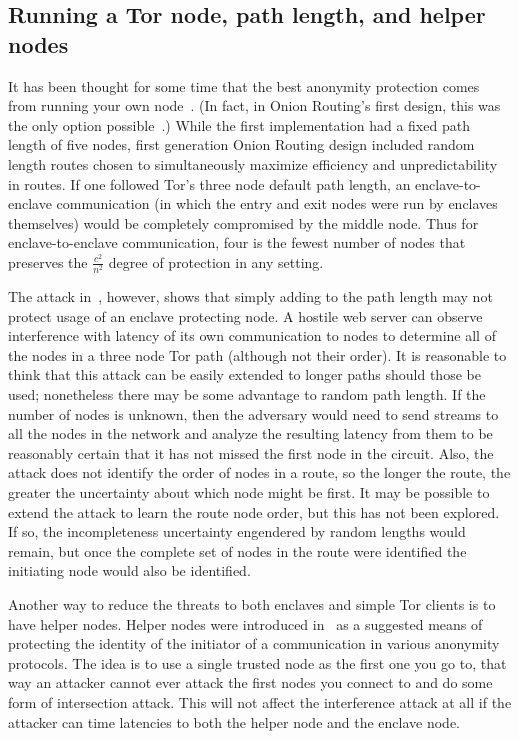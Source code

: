 \documentclass{llncs}
\begin{document}
\subsection{Running a Tor node, path length, and helper nodes}
\label{subsec:helper-nodes}

It has been thought for some time that the best anonymity protection
comes from running your own node~\cite{or-pet00,tor-design}.
(In fact, in Onion Routing's first design, this was the only option
possible~\cite{or-ih96}.)  While the first implementation
had a fixed path length of five nodes, first generation
Onion Routing design included random length routes chosen 
to simultaneously maximize efficiency and unpredictability in routes.
If one followed Tor's three node default
path length, an enclave-to-enclave communication (in which the entry and
exit nodes were run by enclaves themselves) 
would be completely compromised by the
middle node. Thus for enclave-to-enclave communication, four is the fewest
number of nodes that preserves the $\frac{c^2}{n^2}$ degree of protection
in any setting.

The attack in~\cite{attack-tor-oak05}, however,
shows that simply adding to the
path length may not protect usage of an enclave protecting node.  A
hostile web server can observe interference with latency of its own
communication to nodes  to determine all of the nodes in a three node Tor
path (although not their order).
It is reasonable to think that this attack can be easily extended to
longer paths should those be used; nonetheless there may be some
advantage to random path length. If the number of nodes is unknown,
then the adversary would need to send streams to all the nodes in the
network and analyze the resulting latency from them to be reasonably
certain that it has not missed the first node in the circuit. Also,
the attack does not identify the order of nodes in a route, so the
longer the route, the greater the uncertainty about which node might
be first. It may be possible to extend the attack to learn the route
node order, but this has not been explored.
If so, the incompleteness uncertainty engendered by random lengths would
remain, but once the complete set of nodes in the route were identified
the initiating node would also be identified.

Another way to reduce the threats to both enclaves and simple Tor
clients is to have helper nodes. Helper nodes were introduced
in~\cite{wright03} as a suggested means of protecting the identity
of the initiator of a communication in various anonymity protocols.
The idea is to use a single trusted node as the first one you go to,
that way an attacker cannot ever attack the first nodes you connect
to and do some form of intersection attack. This will not affect the
interference attack at all if the attacker can time latencies to
both the helper node and the enclave node.
\end{document}
